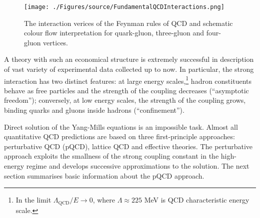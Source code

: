 \begin{figure}[t]
	\centering
		\texttt{[image: ./Figures/source/FundamentalQCDInteractions.png]}
	\caption{The interaction verices of the Feynman rules of QCD and schematic colour flow interpretation for quark-gluon, three-gluon and four-gluon vertices.}
	\label{fig:FundamentalQCDInteractions}
\end{figure}

A theory with such an economical structure is extremely successful in description of vast variety of experimental data collected up to now. In particular, the strong interaction has two distinct features: at large energy scales,\footnote{In the limit $\Lambda_\mathrm{QCD}/E\rightarrow 0$, where $\Lambda\approx 225$ MeV is QCD characteristic energy scale.} hadron constituents behave as free particles and the strength of the coupling decreases (``asymptotic freedom''); conversely, at low energy scales, the strength of the coupling grows, binding quarks and gluons inside hadrons (``confinement'').  
 
Direct solution of the Yang-Mills equations is an impossible task. Almost all quantitative QCD predictions are based on three first-principle approaches: perturbative QCD (pQCD), lattice QCD and effective theories. The perturbative approach exploits the smallness of the strong coupling constant in the high-energy regime and develops successive approximations to the solution. The next section summarises basic information about the pQCD approach.

